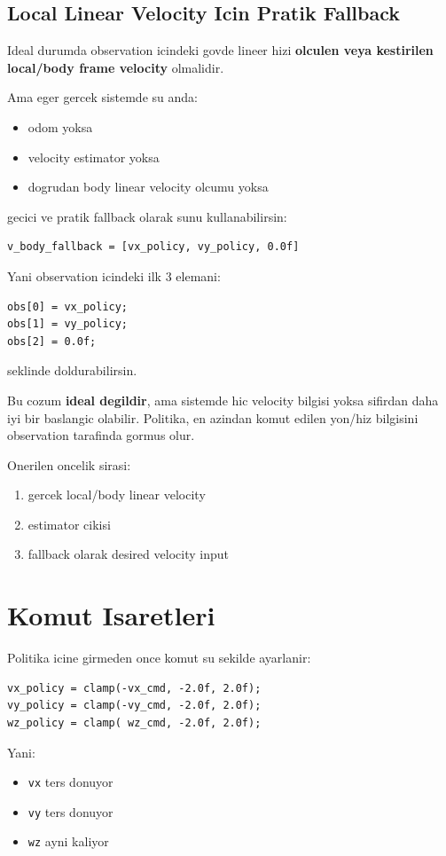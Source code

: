 \documentclass[11pt,a4paper]{article}
\begin{document}
\subsection*{Local Linear Velocity Icin Pratik Fallback}
Ideal durumda observation icindeki govde lineer hizi \textbf{olculen veya kestirilen local/body frame velocity} olmalidir.

\noindent
Ama eger gercek sistemde su anda:
\begin{itemize}
  \item odom yoksa
  \item velocity estimator yoksa
  \item dogrudan body linear velocity olcumu yoksa
\end{itemize}
gecici ve pratik fallback olarak sunu kullanabilirsin:

\begin{lstlisting}
v_body_fallback = [vx_policy, vy_policy, 0.0f]
\end{lstlisting}

\noindent
Yani observation icindeki ilk 3 elemani:
\begin{lstlisting}
obs[0] = vx_policy;
obs[1] = vy_policy;
obs[2] = 0.0f;
\end{lstlisting}
seklinde doldurabilirsin.

\noindent
Bu cozum \textbf{ideal degildir}, ama sistemde hic velocity bilgisi yoksa sifirdan daha iyi bir baslangic olabilir. Politika, en azindan komut edilen yon/hiz bilgisini observation tarafinda gormus olur.

\noindent
Onerilen oncelik sirasi:
\begin{enumerate}
  \item gercek local/body linear velocity
  \item estimator cikisi
  \item fallback olarak desired velocity input
\end{enumerate}

\section{Komut Isaretleri}
Politika icine girmeden once komut su sekilde ayarlanir:

\begin{lstlisting}
vx_policy = clamp(-vx_cmd, -2.0f, 2.0f);
vy_policy = clamp(-vy_cmd, -2.0f, 2.0f);
wz_policy = clamp( wz_cmd, -2.0f, 2.0f);
\end{lstlisting}

\noindent
Yani:
\begin{itemize}
  \item \texttt{vx} ters donuyor
  \item \texttt{vy} ters donuyor
  \item \texttt{wz} ayni kaliyor
\end{itemize}
\end{document}
